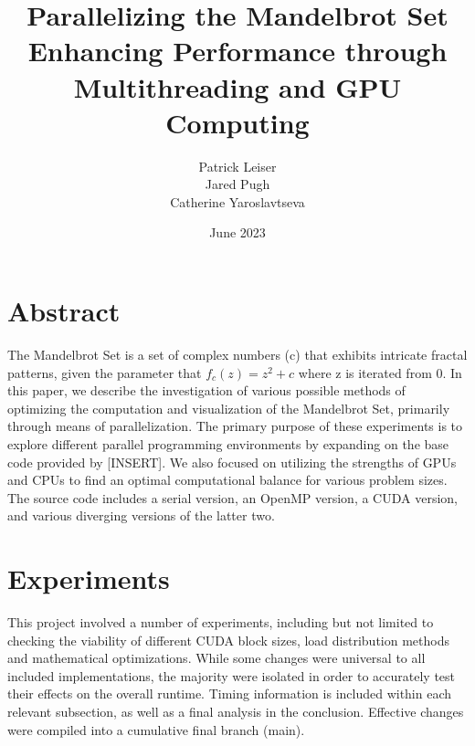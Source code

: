 \documentclass{article}
\begin{document}
\title{\textbf{Parallelizing the Mandelbrot Set \\ \large Enhancing
Performance through Multithreading and GPU Computing}}
\author{\begin{tabular}{cc}Patrick Leiser\\
Jared Pugh\\Catherine Yaroslavtseva\\\end{tabular}}

\date{June 2023}

\maketitle

\section{Abstract}

The Mandelbrot Set is a set of complex numbers (c) that exhibits intricate
fractal patterns, given the parameter that $f_c(z) = z^2 + c$ where z is 
iterated from 0.
In this paper, we describe the investigation of various possible methods of 
optimizing the computation and visualization of the Mandelbrot Set,
primarily through means of parallelization.
The primary purpose of these experiments is to explore different parallel 
programming environments by expanding on the base code provided by [INSERT].
We also focused on utilizing the strengths of GPUs and CPUs to find an 
optimal computational balance for various problem sizes.\\ 

The source code includes a serial version, an OpenMP version, a CUDA 
version, and various diverging versions of the latter two.

\section{Experiments}

This project involved a number of experiments, including but not limited to
checking the viability of different CUDA block sizes, load distribution 
methods and mathematical optimizations.
While some changes were universal to all included implementations, the
majority were isolated in order to accurately test their effects on the 
overall runtime.
Timing information is included within each relevant subsection, as well as
a final analysis in the conclusion.
Effective changes were compiled into a cumulative final branch (main).
\end{document}
